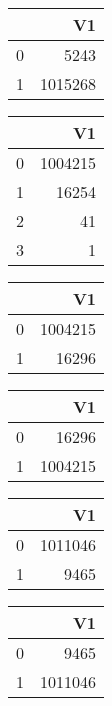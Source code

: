 \bigskip\bigskip
\centering
\begin{tabular}{rr}
  \hline
 & V1 \\ 
  \hline
0 & 5243 \\ 
  1 & 1015268 \\ 
   \hline
\end{tabular}

\bigskip\bigskip
\centering
\begin{tabular}{rr}
  \hline
 & V1 \\ 
  \hline
0 & 1004215 \\ 
  1 & 16254 \\ 
  2 &  41 \\ 
  3 &   1 \\ 
   \hline
\end{tabular}

\bigskip\bigskip
\centering
\begin{tabular}{rr}
  \hline
 & V1 \\ 
  \hline
0 & 1004215 \\ 
  1 & 16296 \\ 
   \hline
\end{tabular}

\bigskip\bigskip
\centering
\begin{tabular}{rr}
  \hline
 & V1 \\ 
  \hline
0 & 16296 \\ 
  1 & 1004215 \\ 
   \hline
\end{tabular}

\bigskip\bigskip
\centering
\begin{tabular}{rr}
  \hline
 & V1 \\ 
  \hline
0 & 1011046 \\ 
  1 & 9465 \\ 
   \hline
\end{tabular}

\bigskip\bigskip
\centering
\begin{tabular}{rr}
  \hline
 & V1 \\ 
  \hline
0 & 9465 \\ 
  1 & 1011046 \\ 
   \hline
\end{tabular}

